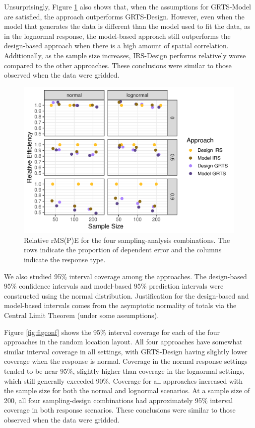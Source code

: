 \documentclass[]{elsarticle} %
\begin{document}
Unsurprisingly, Figure \ref{fig:figeff} also shows that, when the
assumptions for GRTS-Model are satisfied, the approach outperforms
GRTS-Design. However, even when the model that generates the data is
different than the model used to fit the data, as in the lognormal
response, the model-based approach still outperforms the design-based
approach when there is a high amount of spatial correlation.
Additionally, as the sample size increases, IRS-Design performs
relatively worse compared to the other approaches. These conclusions
were similar to those observed when the data were gridded.

\begin{figure}
\includegraphics[width=1\linewidth]{manuscript_files/figure-latex/figeff-1} \caption{Relative rMS(P)E for the four sampling-analysis combinations. The rows indicate the proportion of dependent error and the columns indicate the response type.}\label{fig:figeff}
\end{figure}

We also studied 95\% interval coverage among the approaches. The
design-based 95\% confidence intervals and model-based 95\% prediction
intervals were constructed using the normal distribution. Justification
for the design-based and model-based intervals comes from the asymptotic
normality of totals via the Central Limit Theorem (under some
assumptions).

Figure \ref{fig:figconf} shows the 95\% interval coverage for each of
the four approaches in the random location layout. All four approaches
have somewhat similar interval coverage in all settings, with
GRTS-Design having slightly lower coverage when the response is normal.
Coverage in the normal response settings tended to be near 95\%,
slightly higher than coverage in the lognormal settings, which still
generally exceeded 90\%. Coverage for all approaches increased with the
sample size for both the normal and lognormal scenarios. At a sample
size of 200, all four sampling-design combinations had approximately
95\% interval coverage in both response scenarios. These conclusions
were similar to those observed when the data were gridded.
\end{document}

